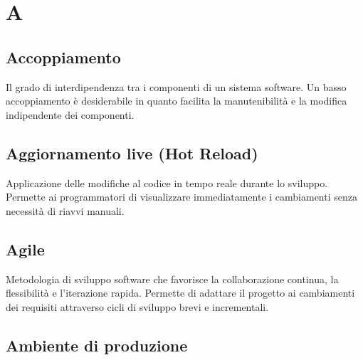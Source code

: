 \documentclass[a4paper, 11pt, oneside]{scrartcl} %
\begin{document}
\newpage
\appendix


\section*{A}


\subsection*{Accoppiamento}


Il grado di interdipendenza tra i componenti di un sistema software. Un basso accoppiamento è desiderabile in quanto facilita la manutenibilità e la modifica indipendente dei componenti.

\vspace{0.5cm}

\subsection*{Aggiornamento live (Hot Reload)}


Applicazione delle modifiche al codice in tempo reale durante lo sviluppo. Permette ai programmatori di visualizzare immediatamente i cambiamenti senza necessità di riavvi manuali.

\vspace{0.5cm}

\subsection*{Agile}


Metodologia di sviluppo software che favorisce la collaborazione continua, la flessibilità e l'iterazione rapida. Permette di adattare il progetto ai cambiamenti dei requisiti attraverso cicli di sviluppo brevi e incrementali.

\vspace{0.5cm}

\subsection*{Ambiente di produzione}
\end{document}

